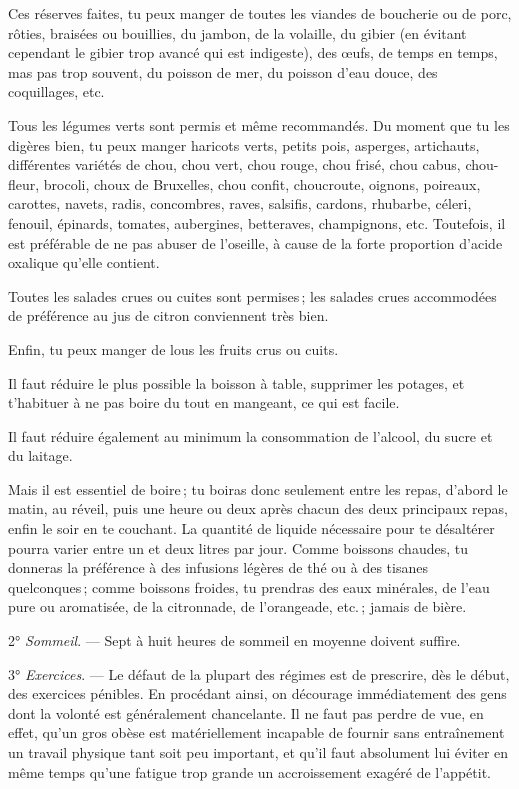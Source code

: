 Ces réserves faites, tu peux manger de toutes les viandes de boucherie ou de
porc, rôties, braisées ou bouillies, du jambon, de la volaille, du gibier (en
évitant cependant le gibier trop avancé qui est indigeste), des œufs, de temps
en temps, mas pas trop souvent, du poisson de mer, du poisson d'eau douce, des
coquillages, etc.

Tous les légumes verts sont permis et même recommandés. Du moment que tu les
digères bien, tu peux manger haricots verts, petits pois, asperges, artichauts,
différentes variétés de chou, chou vert, chou rouge, chou frisé, chou cabus,
chou-fleur, brocoli, choux de Bruxelles, chou confit, choucroute, oignons,
poireaux, carottes, navets, radis, concombres, raves, salsifis, cardons,
rhubarbe, céleri, fenouil, épinards, tomates, aubergines, betteraves,
champignons, etc. Toutefois, il est préférable de ne pas abuser de l'oseille,
à cause de la forte proportion d'acide oxalique qu'elle contient.

Toutes les salades crues ou cuites sont permises ; les salades crues
accommodées de préférence au jus de citron conviennent très bien.

Enfin, tu peux manger de lous les fruits crus ou cuits.

Il faut réduire le plus possible la boisson à table, supprimer les potages, et
t'habituer à ne pas boire du tout en mangeant, ce qui est facile.

Il faut réduire également au minimum la consommation de l'alcool, du sucre et
du laitage.

Mais il est essentiel de boire ; tu boiras donc seulement entre les repas,
d'abord le matin, au réveil, puis une heure ou deux après chacun des deux
principaux repas, enfin le soir en te couchant. La quantité de liquide
nécessaire pour te désaltérer pourra varier entre un et deux litres par jour.
Comme boissons chaudes, tu donneras la préférence à des infusions légères de
thé ou à des tisanes quelconques ; comme boissons froides, tu prendras des eaux
minérales, de l'eau pure ou aromatisée, de la citronnade, de l'orangeade,
etc. ; jamais de bière.

2° \textit{Sommeil}. — Sept à huit heures de sommeil en moyenne doivent
suffire.

3° \textit{Exercices}. — Le défaut de la plupart des régimes est de prescrire,
dès le début, des exercices pénibles. En procédant ainsi, on décourage
immédiatement des gens dont la volonté est généralement chancelante. Il ne faut
pas perdre de vue, en effet, qu'un gros obèse est matériellement incapable de
fournir sans entraînement un travail physique tant soit peu important, et qu'il
faut absolument lui éviter en même temps qu'une fatigue trop grande un
accroissement exagéré de l'appétit.

